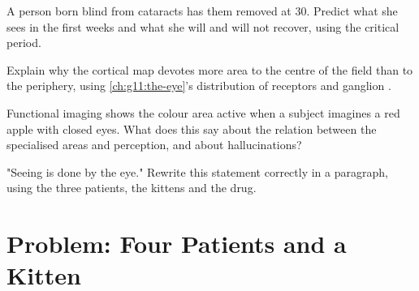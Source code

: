 \begin{exercise}[$\star\star\star$]\label{exo:g11:vision-and-brain:12}
A person born blind from cataracts has them removed at 30. Predict
what she sees in the first weeks and what she will and will not
recover, using the critical period.
\end{exercise}

\begin{exercise}[$\star\star\star$]\label{exo:g11:vision-and-brain:13}
Explain why the cortical map devotes more area to the centre of the
field than to the periphery, using \cref{ch:g11:the-eye}'s
distribution of receptors and ganglion .
\end{exercise}

\begin{exercise}[$\star\star\star$]\label{exo:g11:vision-and-brain:14}
Functional imaging shows the colour area active when a subject
imagines a red apple with closed eyes. What does this say about the
relation between the specialised areas and perception, and about
hallucinations?
\end{exercise}

\begin{exercise}[$\star\star\star$]\label{exo:g11:vision-and-brain:15}
"Seeing is done by the eye." Rewrite this statement correctly in a
paragraph, using the three patients, the kittens and the drug.
\end{exercise}

\section{Problem: Four Patients and a Kitten}

